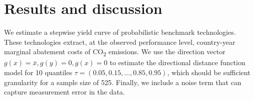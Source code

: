 \documentclass[
  10pt,
]{article}
\begin{document}
\hypertarget{results-and-discussion}{%
\section{Results and discussion}\label{results-and-discussion}}

We estimate a stepwise yield curve of probabilistic benchmark
technologies. These technologies extract, at the observed performance
level, country-year marginal abatement costs of CO\textsubscript{2}
emissions. We use the direction vector \(g(x)=\bar{x}, g(y)=0, g(x)=0\)
to estimate the directional distance function model for 10 quantiles
\(\tau=(0.05,0.15,\dots,0.85,0.95)\), which should be sufficient
granularity for a sample size of 525. Finally, we include a noise term
that can capture measurement error in the data.
\end{document}
